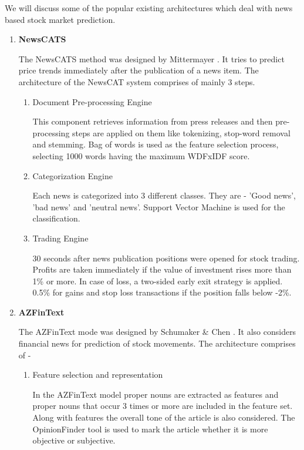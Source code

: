 \documentclass[a4paper,12bp]{report}
\begin{document}
We will discuss some of the popular existing architectures which deal with news based stock market prediction.
\newpage
\begin{enumerate} 
\item \textbf{NewsCATS}

The NewsCATS method was designed by Mittermayer \cite{1265201}. It tries to predict price trends immediately after the publication of a news item. The architecture of the NewsCAT system comprises of mainly 3 steps.

\begin{enumerate}
\item Document Pre-processing Engine

This component retrieves information from press releases and then pre-processing steps are applied on them like tokenizing, stop-word removal and stemming. Bag of words is used as the feature selection process, selecting 1000 words having the maximum WDFxIDF score. 

\item Categorization Engine

Each news is categorized into 3 different classes. They are - 'Good news', 'bad news' and 'neutral news'. Support Vector Machine is used for the classification.

\item Trading Engine

30 seconds after news publication positions were opened for stock trading. Profits are taken immediately if the value of investment rises more than 1\% or more. In case of loss, a two-sided early exit strategy is applied. 0.5\% for gains and stop loss transactions if the position falls below -2\%. 
\end{enumerate}

\item \textbf{AZFinText}

The AZFinText mode was designed by Schumaker \& Chen \cite{Schumaker:2009}. It also considers financial news for prediction of stock movements. The architecture comprises of -

\begin{enumerate}
\item Feature selection and representation

In the AZFinText model proper nouns are extracted as features and proper nouns that occur 3 times or more are included in the feature set. Along with features the overall tone of the article is also considered. The OpinionFinder tool is used to mark the article whether it is more objective or subjective. 


\end{enumerate}
\end{enumerate}
\end{document}
